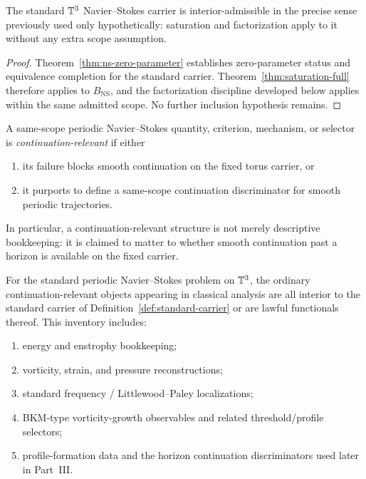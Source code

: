 \begin{corollary}\label{cor:certified-inclusion}
The standard $\mathbb{T}^3$ Navier--Stokes carrier is interior-admissible in the precise sense previously used
only hypothetically: saturation and factorization apply to it without any extra scope assumption.
\end{corollary}

\begin{proof}
Theorem~\ref{thm:ns-zero-parameter} establishes zero-parameter status and equivalence completion for
the standard carrier. Theorem~\ref{thm:saturation-full} therefore applies to $B_{\mathrm{NS}}$, and the
factorization discipline developed below applies within the same admitted scope. No further inclusion
hypothesis remains.
\end{proof}

\begin{definition}
\label{def:continuation-relevant-pde-structure}
A same-scope periodic Navier--Stokes quantity, criterion, mechanism, or selector is
\emph{continuation-relevant} if either
\begin{enumerate}[label=(\roman*), leftmargin=2.2em]
\item its failure blocks smooth continuation on the fixed torus carrier, or
\item it purports to define a same-scope continuation discriminator for smooth periodic trajectories.
\end{enumerate}
In particular, a continuation-relevant structure is not merely descriptive bookkeeping: it is claimed
to matter to whether smooth continuation past a horizon is available on the fixed carrier.
\end{definition}

\begin{lemma}
\label{lem:inventory-standard-continuation-relevant-structures}
For the standard periodic Navier--Stokes problem on $\mathbb{T}^3$, the ordinary continuation-relevant
objects appearing in classical analysis are all interior to the standard carrier of
Definition~\ref{def:standard-carrier} or are lawful functionals thereof. This inventory includes:
\begin{enumerate}[label=(\roman*), leftmargin=2.2em]
\item energy and enstrophy bookkeeping;
\item vorticity, strain, and pressure reconstructions;
\item standard frequency / Littlewood--Paley localizations;
\item BKM-type vorticity-growth observables and related threshold/profile selectors;
\item profile-formation data and the horizon continuation discriminators used later in Part~III.
\end{enumerate}
\end{lemma}

